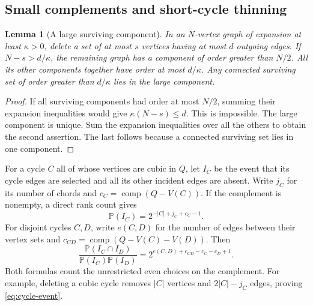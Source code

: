 \documentclass[11pt,a4paper]{article}
\numberwithin{equation}{section}
\newtheorem{lemma}[theorem]{Lemma}
\theoremstyle{definition}
\theoremstyle{remark}
\newcommand{\Prob}{\mathbb P}
\newcommand{\cc}{\operatorname{comp}}
\begin{document}
\subsection{Small complements and short-cycle thinning}
\begin{lemma}[A large surviving component]\label{lem:giant}
In an $N$-vertex graph of expansion at least $\kappa>0$, delete a set of at most $s$ vertices having at most $d$ outgoing edges. If $N-s>d/\kappa$, the remaining graph has a component of order greater than $N/2$. All its other components together have order at most $d/\kappa$. Any connected surviving set of order greater than $d/\kappa$ lies in the large component.
\end{lemma}
\begin{proof}
If all surviving components had order at most $N/2$, summing their expansion inequalities would give $\kappa(N-s)\le d$. This is impossible. The large component is unique. Sum the expansion inequalities over all the others to obtain the second assertion. The last follows because a connected surviving set lies in one component.
\end{proof}

For a cycle $C$ all of whose vertices are cubic in $Q$, let $I_C$ be the event that its cycle edges are selected and all its other incident edges are absent. Write $j_C$ for its number of chords and $c_C=\cc(Q-V(C))$. If the complement is nonempty, a direct rank count gives
\begin{equation}\label{eq:cycle-event}
 \Prob(I_C)=2^{-|C|+j_C+c_C-1}.
\end{equation}
For disjoint cycles $C,D$, write $e(C,D)$ for the number of edges between their vertex sets and $c_{CD}=\cc(Q-V(C)-V(D))$. Then
\begin{equation}\label{eq:pair-event}
 \frac{\Prob(I_C\cap I_D)}{\Prob(I_C)\Prob(I_D)}
 =2^{e(C,D)+c_{CD}-c_C-c_D+1}.
\end{equation}
Both formulas count the unrestricted even choices on the complement. For example, deleting a cubic cycle removes $|C|$ vertices and $2|C|-j_C$ edges, proving \eqref{eq:cycle-event}.
\end{document}
